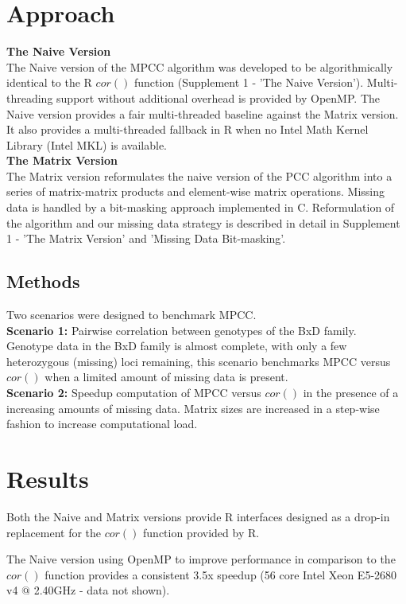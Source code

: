 \documentclass{bioinfo}
\begin{document}
\section{Approach}
\textbf{The Naive Version}\\
The Naive version of the MPCC algorithm was developed to be algorithmically identical 
to the R $cor()$ function (Supplement 1 - 'The Naive Version'). Multi-threading 
support without additional overhead is provided by OpenMP. The Naive version 
provides a fair multi-threaded baseline against the Matrix version. It also provides 
a multi-threaded fallback in R when no Intel\textregistered{} Math Kernel Library 
(Intel\textregistered{} MKL) is available.\\
\textbf{The Matrix Version}\\
The Matrix version reformulates the naive version of the PCC algorithm 
into a series of matrix-matrix products and element-wise matrix operations. 
Missing data is handled by a bit-masking approach implemented in C. 
Reformulation of the algorithm and our missing data strategy is described 
in detail in Supplement 1 - 'The Matrix Version' and 'Missing Data Bit-masking'. 
\vspace*{-5mm}
\begin{methods}
\section{Methods}
Two scenarios were designed to benchmark MPCC.\\
{\bf Scenario 1:} Pairwise correlation between genotypes of the BxD family. 
Genotype data in the BxD family is almost complete, with only a few heterozygous 
(missing) loci remaining, this scenario benchmarks MPCC versus $cor()$ when a limited 
amount of missing data is present.\\
{\bf Scenario 2:} Speedup computation of MPCC versus $cor()$ in the presence of a 
increasing amounts of missing data. Matrix sizes are increased in a step-wise fashion 
to increase computational load.
\end{methods}
\vspace*{-2mm}
\section{Results}
Both the Naive and Matrix versions provide R interfaces designed as a drop-in 
replacement for the $cor()$ function provided by R.

The Naive version using OpenMP to improve performance in comparison to the 
$cor()$ function provides a consistent 3.5x speedup (56 core Intel Xeon E5-2680 
v4 $@$ 2.40GHz - data not shown).
\end{document}
